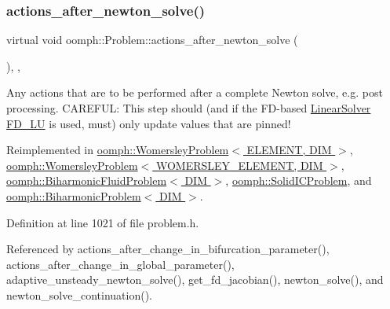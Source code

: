 \mbox{\label{classoomph_1_1Problem_a033ec7301123deeb7e56d04c38f9f1da}} 
\subsubsection{\texorpdfstring{actions\+\_\+after\+\_\+newton\+\_\+solve()}{actions\_after\_newton\_solve()}}
{\footnotesize\ttfamily virtual void oomph\+::\+Problem\+::actions\+\_\+after\+\_\+newton\+\_\+solve (\begin{DoxyParamCaption}{ }\end{DoxyParamCaption})\hspace{0.3cm}{\ttfamily [inline]}, {\ttfamily [protected]}, {\ttfamily [virtual]}}



Any actions that are to be performed after a complete Newton solve, e.\+g. post processing. C\+A\+R\+E\+F\+UL\+: This step should (and if the F\+D-\/based \hyperlink{classoomph_1_1LinearSolver}{Linear\+Solver} \hyperlink{classoomph_1_1FD__LU}{F\+D\+\_\+\+LU} is used, must) only update values that are pinned! 



Reimplemented in \hyperlink{classoomph_1_1WomersleyProblem_a248ab44d5058e1e29dab4fbfc52bf942}{oomph\+::\+Womersley\+Problem$<$ E\+L\+E\+M\+E\+N\+T, D\+I\+M $>$}, \hyperlink{classoomph_1_1WomersleyProblem_a248ab44d5058e1e29dab4fbfc52bf942}{oomph\+::\+Womersley\+Problem$<$ W\+O\+M\+E\+R\+S\+L\+E\+Y\+\_\+\+E\+L\+E\+M\+E\+N\+T, D\+I\+M $>$}, \hyperlink{classoomph_1_1BiharmonicFluidProblem_a6a69be0763564ffd22f598d734d11a26}{oomph\+::\+Biharmonic\+Fluid\+Problem$<$ D\+I\+M $>$}, \hyperlink{classoomph_1_1SolidICProblem_afef1ae777a009afd2329dcb091862f69}{oomph\+::\+Solid\+I\+C\+Problem}, and \hyperlink{classoomph_1_1BiharmonicProblem_ad685995c81201b8e5dfa7136e1858713}{oomph\+::\+Biharmonic\+Problem$<$ D\+I\+M $>$}.



Definition at line 1021 of file problem.\+h.



Referenced by actions\+\_\+after\+\_\+change\+\_\+in\+\_\+bifurcation\+\_\+parameter(), actions\+\_\+after\+\_\+change\+\_\+in\+\_\+global\+\_\+parameter(), adaptive\+\_\+unsteady\+\_\+newton\+\_\+solve(), get\+\_\+fd\+\_\+jacobian(), newton\+\_\+solve(), and newton\+\_\+solve\+\_\+continuation().

